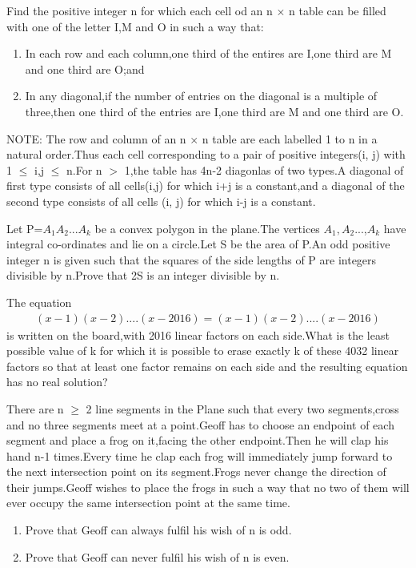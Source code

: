\item Find the positive integer n for which each cell od an n $\times$ n table can be filled with one of the letter I,M and O in such a way that:
\begin{enumerate}
\item In each row and each column,one third of the entires are I,one third are M and one third are O;and 
\item In any diagonal,if the number of entries on the diagonal is a multiple of three,then one third of the entries are I,one third are M and one third are O.
\end{enumerate}
NOTE: The row and column of an n $\times$ n table are each labelled 1 to n in a natural order.Thus each cell corresponding to a pair of positive integers(i, j) with 1 $\leq$ i,j $\leq$ n.For n $>$ 1,the table has 4n-2 diagonlas of two types.A diagonal of first type consists of all cells(i,j) for which i+j is a constant,and a diagonal of the second type consists of all cells (i, j) for which i-j is a constant.

\item Let P=$A_1 A_2$...$A_k$ be a convex polygon in the plane.The vertices $A_1,A_2$...,$A_k$ have integral co-ordinates and lie on a circle.Let S be the area of P.An odd positive integer n is given such that the squares of the side lengths of P are integers divisible by n.Prove that 2S is an integer divisible by n.

\item The equation
\begin{align*} 
(x-1)(x-2)....(x-2016)=(x-1)(x-2)....(x-2016)
\end{align*}
is written on the board,with 2016 linear factors on each side.What is the least possible value of k for which it is possible to erase exactly k of these 4032 linear factors so that at least one factor remains on each side and the resulting equation has no real solution?

\item There are n $\geq$ 2 line segments in the Plane such that every two segments,cross and no three segments meet at a point.Geoff has to choose an endpoint of each segment and place a frog on it,facing the other endpoint.Then he will clap his hand n-1 times.Every time he clap each frog will immediately jump forward to the next intersection point on its segment.Frogs never change the direction of their jumps.Geoff wishes to place the frogs in such a way that no two of them will ever occupy the same intersection point at the same time.
\begin{enumerate}
\item Prove that Geoff can always fulfil his wish of n is odd.
\item Prove that Geoff can never fulfil his wish of n is even.
\end{enumerate}
